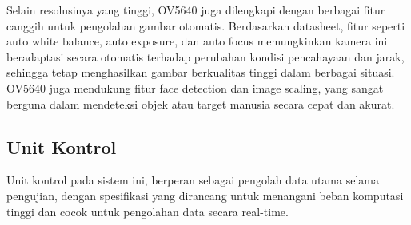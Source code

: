 Selain resolusinya yang tinggi, OV5640 juga dilengkapi dengan berbagai fitur canggih untuk pengolahan gambar otomatis. Berdasarkan datasheet, fitur seperti auto white balance, auto exposure, dan auto focus memungkinkan kamera ini beradaptasi secara otomatis terhadap perubahan kondisi pencahayaan dan jarak, sehingga tetap menghasilkan gambar berkualitas tinggi dalam berbagai situasi. OV5640 juga mendukung fitur face detection dan image scaling, yang sangat berguna dalam mendeteksi objek atau target manusia secara cepat dan akurat.

\subsection{Unit Kontrol}
\label{subsec:UnitKontrol}


Unit kontrol pada sistem ini, berperan sebagai pengolah data utama selama pengujian, dengan spesifikasi yang dirancang untuk menangani beban komputasi tinggi dan cocok untuk pengolahan data secara real-time.

